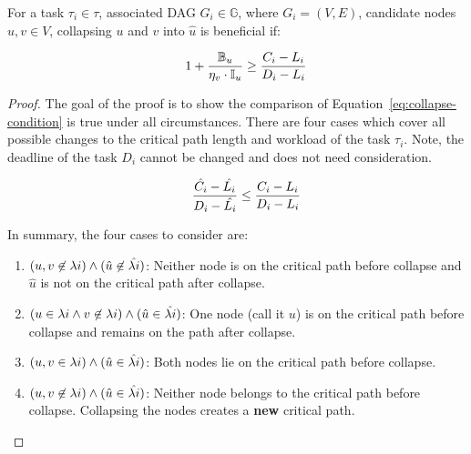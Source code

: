 \begin{theorem} For a task
  ${\tau_i \in \tau}$, associated DAG ${G_i \in \mathbb{G}}$,
  where ${G_i = (V, E)}$, candidate nodes ${u,v \in V}$,
  collapsing ${u}$ and ${v}$ into ${\hat{u}}$ is beneficial if:

  \begin{equation}
    \indent
    1 + \frac{\mathbb{B}_u}{\eta_v \cdot \mathbb{I}_u}
    \ge
    \frac{C_i - L_i}
         {D_i - L_i}
    \label{eq:condition}
  \end{equation}

  \begin{proof}
    The goal of the proof is to show the comparison of
    Equation~\ref{eq:collapse-condition} is true
    under all circumstances. There are four cases which cover all
    possible changes to the critical path length and workload of the
    task ${\tau_i}$. Note, the deadline of the task ${D_i}$ cannot
    be changed and does not need consideration. 

    \begin{equation} \label{eq:collapse-condition}
      \indent
      \frac{\hat{C_i} - \hat{L_i}}
           {D_i - \hat{L_i}} \le
      \frac{C_i - L_i}
           {D_i - L_i}
    \end{equation}

    In summary, the four cases to consider are:

    \begin{enumerate}
    \item ${(u, v \not \in \lambda{i})
      \land
      (\hat{u} \not \in \hat{\lambda{i}})}$:
      Neither node is on the critical path before collapse and
      ${\hat{u}}$ is not on the critical path after collapse. 
    \item ${(u \in \lambda{i} \land v \not \in \lambda{i})
      \land
      (\hat{u} \in \hat{\lambda{i}})}$: One node (call it ${u}$)
      is on the critical path before collapse and remains on the path
      after collapse.
    \item ${(u,v \in \lambda{i}) \land
      (\hat{u} \in \hat{\lambda{i}})}$: Both nodes lie
      on the critical path before collapse.
    \item ${(u,v \not \in \lambda{i}) \land
      (\hat{u} \in \hat{\lambda{i}})}$: Neither node
      belongs to the critical path before collapse. Collapsing the
      nodes creates a \textbf{new} critical path.
    \end{enumerate}


\end{proof}
\end{theorem}
